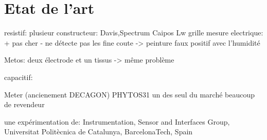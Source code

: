 \section{Etat de l'art}
resistif:
plusieur constructeur:
Davis,Spectrum Caipos Lw
grille mesure electrique:
+ pas cher
- ne détecte pas les fine coute -> peinture
faux positif avec l'humidité

Metos: deux électrode et un tissus -> même problème

capacitif:

Meter (ancienement DECAGON) PHYTOS31 
un des seul du marché beaucoup de revendeur

une expérimentation de: Instrumentation, Sensor and Interfaces Group, Universitat Politècnica de Catalunya, BarcelonaTech, Spain 
